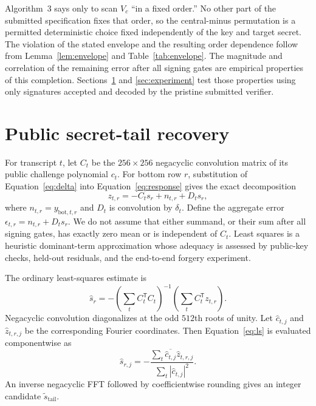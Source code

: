 \documentclass[11pt,a4paper]{article}
\newcommand{\trans}{\mathsf{T}}
\begin{document}
Algorithm~3 says only to scan $V_c$ ``in a fixed order.''  No other part of
the submitted specification fixes that order, so the central-minus
permutation is a permitted deterministic choice fixed independently of the
key and target secret.  The violation of the stated envelope and the resulting
order dependence follow from Lemma~\ref{lem:envelope} and
Table~\ref{tab:envelope}.  The magnitude and correlation of the remaining
error after all signing gates are empirical properties of this completion.
Sections~\ref{sec:recovery} and \ref{sec:experiment} test those properties
using only signatures accepted and decoded by the pristine submitted
verifier.

\section{Public secret-tail recovery}
\label{sec:recovery}

For transcript $t$, let $C_t$ be the $256\times256$ negacyclic convolution
matrix of its public challenge polynomial $c_t$.  For bottom row $r$,
substitution of Equation~\eqref{eq:delta} into
Equation~\eqref{eq:response} gives the exact decomposition
\begin{equation}
 z_{t,r}=-C_t s_r+n_{t,r}+D_t s_r,                    \label{eq:model}
\end{equation}
where $n_{t,r}=y_{\mathrm{bot},t,r}$ and $D_t$ is convolution by
$\delta_t$.  Define the aggregate error
$\epsilon_{t,r}=n_{t,r}+D_t s_r$.  We do not assume that either summand, or
their sum after all signing gates, has exactly zero mean or is independent of
$C_t$.  Least squares is a heuristic dominant-term approximation whose
adequacy is assessed by public-key checks, held-out residuals, and the
end-to-end forgery experiment.

The ordinary least-squares estimate is
\begin{equation}
 \widehat{s}_r=-\left(\sum_t C_t^{\trans}C_t\right)^{-1}
                    \left(\sum_t C_t^{\trans}z_{t,r}\right).
                                                               \label{eq:ls}
\end{equation}
Negacyclic convolution diagonalizes at the odd $512$th roots of unity.  Let
$\widehat c_{t,j}$ and $\widehat z_{t,r,j}$ be the corresponding Fourier
coordinates.  Then Equation~\eqref{eq:ls} is evaluated componentwise as
\begin{equation}
 \widehat s_{r,j}=-
 \frac{\sum_t\overline{\widehat c_{t,j}}\widehat z_{t,r,j}}
      {\sum_t|\widehat c_{t,j}|^2}.                   \label{eq:fft}
\end{equation}
An inverse negacyclic FFT followed by coefficientwise rounding gives an
integer candidate $\widetilde s_{\mathrm{tail}}$.
\end{document}
